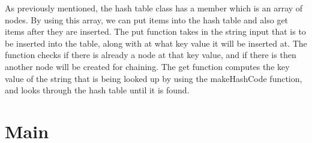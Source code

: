 \documentclass{article}
\begin{document}
\noindent As previously mentioned, the hash table class has a member which is an array of nodes. By using this array, we can put items into the hash table and also get items after they are inserted. The put function takes in the string input that is to be inserted into the table, along with at what key value it will be inserted at. The function checks if there is already a node at that key value, and if there is then another node will be created for chaining. The get function computes the key value of the string that is being looked up by using the makeHashCode function, and looks through the hash table until it is found. 

\section{Main}
\end{document}
